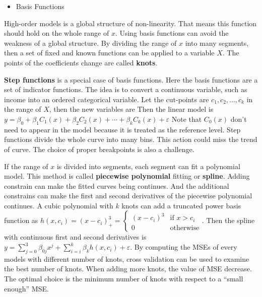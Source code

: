 \documentclass[
  11pt,
  openany]{memoir}
\providecommand{\tightlist}{%
  \setlength{\itemsep}{0pt}\setlength{\parskip}{0pt}}
\begin{document}
\begin{itemize}
\tightlist
\item
  Basis Functions
\end{itemize}

High-order models is a global structure of non-linearity. That means this function should hold on the whole range of \(x\).
Using basis functions can avoid the weakness of a global structure. By dividing the range of \(x\) into many segments, then a set of fixed and known functions can be applied to a variable \(X\).
The points of the coefficients change are called \textbf{knots}.

\textbf{Step functions} is a special case of basis functions. Here the basis functions are a set of indicator functions.
The idea is to convert a continuous variable, such as income into an ordered categorical variable. Let the cut-points are \(c_1,c_2,..., c_k\) in the range of \(X\), then the new variables are
Then the linear model is \(y=\beta_0+\beta_1C_1(x)+\beta_2C_2(x)+\cdots+\beta_{k}C_k(x)+\varepsilon\)
Note that \(C_0(x)\) don't need to appear in the model because it is treated as the reference level.
Step functions divide the whole curve into many bins. This action could miss the trend of curve.
The choice of proper breakpoints is also a challenge.

If the range of \(x\) is divided into segments, each segment can fit a polynomial model. This method is called \textbf{piecewise polynomial} fitting or \textbf{spline}.
Adding constrain can make the fitted curves being continues. And the additional constrains can make the first and second derivatives of the piecewise polynomial continues.
A cubic polynomial with \(k\) knots can add a truncated power basis function as
\(h(x,c_i)=(x-c_i)^3_+=\begin{cases}(x-c_i)^3&\text{if }x>c_i\\0&\text{otherwise}\end{cases}\).
Then the spline with continuous first and second derivatives is
\(y=\sum_{j=0}^3\beta_{0j}x^j+\sum_{i=i}^k\beta_{k}h(x,c_i)+\varepsilon\).
By computing the MSEs of every models with different number of knots, cross validation can be used to examine the best number of knots.
When adding more knots, the value of MSE decrease. The optimal choice is the minimum number of knots with respect to a ``small enough'' MSE.
\end{document}
